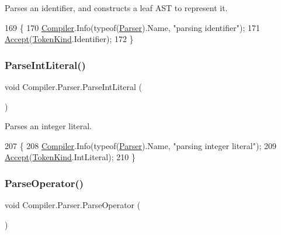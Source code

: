 Parses an identifier, and constructs a leaf A\+ST to represent it. 
\begin{DoxyCode}
169                                                      \{
170                         \mbox{\hyperlink{namespace_compiler}{Compiler}}.Info(typeof(\mbox{\hyperlink{class_compiler_1_1_parser_a450e11452db3f91ff866fc1e36ebc79d}{Parser}}).Name, \textcolor{stringliteral}{"parsing identifier"});
171                         \mbox{\hyperlink{class_compiler_1_1_parser_aaedaac51ec193dd68541fd9d39fddde8}{Accept}}(\mbox{\hyperlink{namespace_compiler_a57929962f25004759596fc3f13cf563c}{TokenKind}}.Identifier);
172                     \}
\end{DoxyCode}
\mbox{\label{class_compiler_1_1_parser_a052fa556c8a6b8a8d677a1faaa3342db}} 
\subsubsection{\texorpdfstring{Parse\+Int\+Literal()}{ParseIntLiteral()}}
{\footnotesize\ttfamily void Compiler.\+Parser.\+Parse\+Int\+Literal (\begin{DoxyParamCaption}{ }\end{DoxyParamCaption})\hspace{0.3cm}{\ttfamily [protected]}}

Parses an integer literal. 
\begin{DoxyCode}
207                                                      \{
208                         \mbox{\hyperlink{namespace_compiler}{Compiler}}.Info(typeof(\mbox{\hyperlink{class_compiler_1_1_parser_a450e11452db3f91ff866fc1e36ebc79d}{Parser}}).Name, \textcolor{stringliteral}{"parsing integer literal"});
209                         \mbox{\hyperlink{class_compiler_1_1_parser_aaedaac51ec193dd68541fd9d39fddde8}{Accept}}(\mbox{\hyperlink{namespace_compiler_a57929962f25004759596fc3f13cf563c}{TokenKind}}.IntLiteral);
210                     \}
\end{DoxyCode}
\mbox{\label{class_compiler_1_1_parser_ae03983db321bc672df2b8400f03eb67e}} 
\subsubsection{\texorpdfstring{Parse\+Operator()}{ParseOperator()}}
{\footnotesize\ttfamily void Compiler.\+Parser.\+Parse\+Operator (\begin{DoxyParamCaption}{ }\end{DoxyParamCaption})\hspace{0.3cm}{\ttfamily [protected]}}


